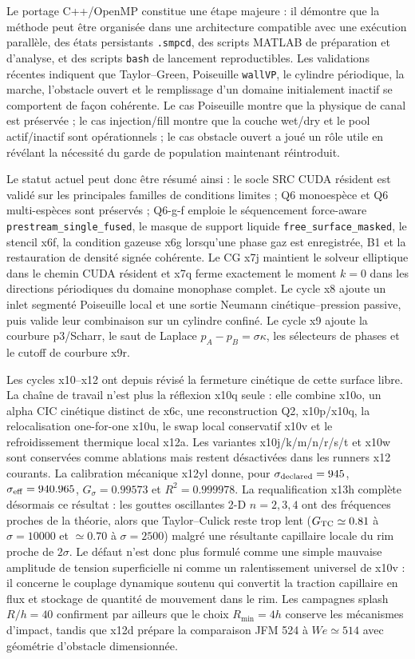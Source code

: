 \documentclass[11pt,a4paper]{article}
\begin{document}
Le portage C++/OpenMP constitue une étape majeure : il démontre que la méthode peut être organisée dans une architecture compatible avec une exécution parallèle, des états persistants \texttt{.smpcd}, des scripts MATLAB de préparation et d'analyse, et des scripts \texttt{bash} de lancement reproductibles. Les validations récentes indiquent que Taylor--Green, Poiseuille \texttt{wallVP}, le cylindre périodique, la marche, l'obstacle ouvert et le remplissage d'un domaine initialement inactif se comportent de façon cohérente. Le cas Poiseuille montre que la physique de canal est préservée ; le cas injection/fill montre que la couche wet/dry et le pool actif/inactif sont opérationnels ; le cas obstacle ouvert a joué un rôle utile en révélant la nécessité du garde de population maintenant réintroduit.

Le statut actuel peut donc être résumé ainsi : le socle SRC CUDA résident est validé sur les principales familles de conditions limites ; Q6 monoespèce et Q6 multi-espèces sont préservés ; Q6-g-f emploie le séquencement force-aware \texttt{prestream\_single\_fused}, le masque de support liquide \texttt{free\_surface\_masked}, le stencil x6f, la condition gazeuse x6g lorsqu'une phase gaz est enregistrée, B1 et la restauration de densité signée cohérente. Le CG x7j maintient le solveur elliptique dans le chemin CUDA résident et x7q ferme exactement le moment $k=0$ dans les directions périodiques du domaine monophase complet. Le cycle x8 ajoute un inlet segmenté Poiseuille local et une sortie Neumann cinétique--pression passive, puis valide leur combinaison sur un cylindre confiné. Le cycle x9 ajoute la courbure p3/Scharr, le saut de Laplace $p_A-p_B=\sigma\kappa$, les sélecteurs de phases et le cutoff de courbure x9r.

Les cycles x10--x12 ont depuis révisé la fermeture cinétique de cette surface libre. La chaîne de travail n'est plus la réflexion x10q seule : elle combine x10o, un alpha CIC cinétique distinct de x6c, une reconstruction Q2, x10p/x10q, la relocalisation one-for-one x10u, le swap local conservatif x10v et le refroidissement thermique local x12a. Les variantes x10j/k/m/n/r/s/t et x10w sont conservées comme ablations mais restent désactivées dans les runners x12 courants. La calibration mécanique x12yl donne, pour $\sigma_{\rm declared}=945$, $\sigma_{\rm eff}=940.965$, $G_\sigma=0.99573$ et $R^2=0.999978$. La requalification x13h complète désormais ce résultat : les gouttes oscillantes 2-D $n=2,3,4$ ont des fréquences proches de la théorie, alors que Taylor--Culick reste trop lent ($G_{\rm TC}\simeq0.81$ à $\sigma=10000$ et $\simeq0.70$ à $\sigma=2500$) malgré une résultante capillaire locale du rim proche de $2\sigma$. Le défaut n'est donc plus formulé comme une simple mauvaise amplitude de tension superficielle ni comme un ralentissement universel de x10v : il concerne le couplage dynamique soutenu qui convertit la traction capillaire en flux et stockage de quantité de mouvement dans le rim. Les campagnes splash $R/h=40$ confirment par ailleurs que le choix $R_{\min}=4h$ conserve les mécanismes d'impact, tandis que x12d prépare la comparaison JFM 524 à $We\simeq514$ avec géométrie d'obstacle dimensionnée.
\end{document}
